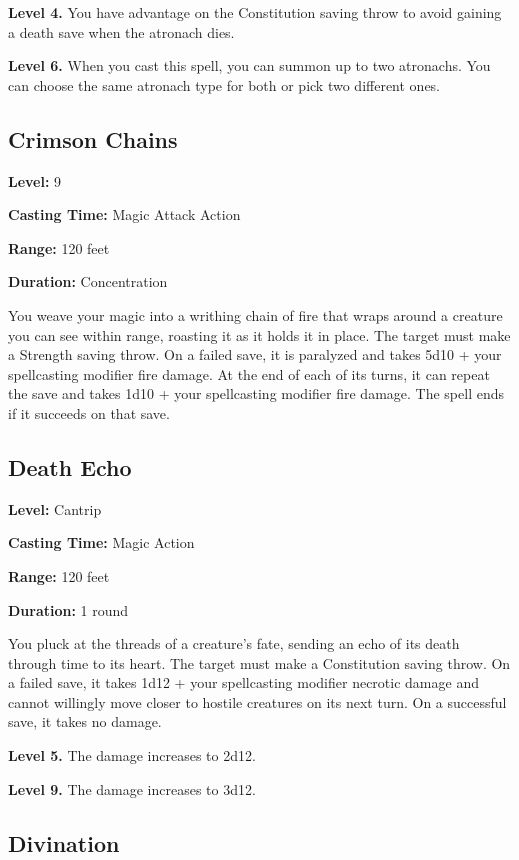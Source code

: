 \documentclass[12pt,letterpaper,twocolumn,openany,nodeprecatedcode,bg=none]{dndbook}
\begin{document}
\textbf{Level 4.} You have advantage on the Constitution saving throw to
avoid gaining a death save when the atronach dies.

\textbf{Level 6.} When you cast this spell, you can summon up to two
atronachs. You can choose the same atronach type for both or pick two
different ones.

\subsection{Crimson Chains}\label{crimson-chains}

\textbf{Level:} 9

\textbf{Casting Time:} Magic Attack Action

\textbf{Range:} 120 feet

\textbf{Duration:} Concentration

You weave your magic into a writhing chain of fire that wraps around a
creature you can see within range, roasting it as it holds it in place.
The target must make a Strength saving throw. On a failed save, it is
paralyzed and takes 5d10 + your spellcasting modifier fire damage. At
the end of each of its turns, it can repeat the save and takes 1d10 +
your spellcasting modifier fire damage. The spell ends if it succeeds on
that save.

\subsection{Death Echo}\label{death-echo}

\textbf{Level:} Cantrip

\textbf{Casting Time:} Magic Action

\textbf{Range:} 120 feet

\textbf{Duration:} 1 round

You pluck at the threads of a creature's fate, sending an echo of its
death through time to its heart. The target must make a Constitution
saving throw. On a failed save, it takes 1d12 + your spellcasting
modifier necrotic damage and cannot willingly move closer to hostile
creatures on its next turn. On a successful save, it takes no damage.

\textbf{Level 5.} The damage increases to 2d12.

\textbf{Level 9.} The damage increases to 3d12.

\subsection{Divination}\label{divination}
\end{document}
